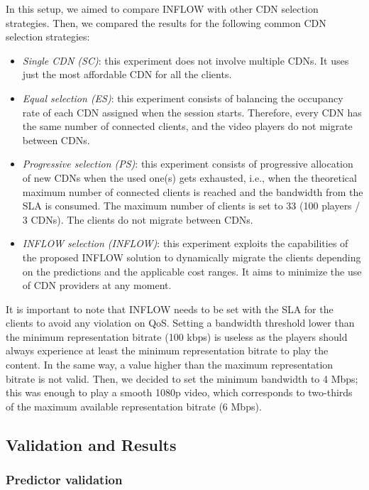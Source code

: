 In this setup, we aimed to compare INFLOW with other CDN selection strategies. Then, we compared the results for the following common CDN selection strategies:
\begin{itemize}
	\item \textit{Single CDN (SC)}: this experiment does not involve multiple CDNs. It uses just the most affordable CDN for all the clients.
	\item \textit{Equal selection (ES)}: this experiment consists of balancing the occupancy rate of each CDN assigned when the session starts. Therefore, every CDN has the same number of connected clients, and the video players do not migrate between CDNs.
	\item \textit{Progressive selection (PS)}: this experiment consists of progressive allocation of new CDNs when the used one(s) gets exhausted, i.e., when the theoretical maximum number of connected clients is reached and the bandwidth from the SLA is consumed. The maximum number of clients is set to 33 (100 players / 3 CDNs). The clients do not migrate between CDNs.
	\item \textit{INFLOW selection (INFLOW)}: this experiment exploits the capabilities of the proposed INFLOW solution to dynamically migrate the clients depending on the predictions and the applicable cost ranges. It aims to minimize the use of CDN providers at any moment.
\end{itemize}

It is important to note that INFLOW needs to be set with the SLA for the clients to avoid any violation on QoS. Setting a bandwidth threshold lower than the minimum representation bitrate (100 kbps) is useless as the players should always experience at least the minimum representation bitrate to play the content. In the same way, a value higher than the maximum representation bitrate is not valid. Then, we decided to set the minimum bandwidth to 4 Mbps; this was enough to play a smooth 1080p video, which corresponds to two-thirds of the maximum available representation bitrate (6 Mbps).

\subsection{Validation and Results}
\label{sec:validation}

\subsubsection{Predictor validation}
\label{sec:mlmodel}

